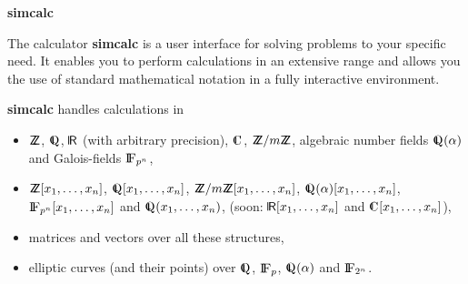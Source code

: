 \newpage
\noindent
\begin{center}
{\Large {\bf simcalc}}
\end{center}

\vspace{0.4cm}

\noindent
The calculator {\bf simcalc} is a user interface for solving problems
to your specific need. It enables you to perform calculations in an
extensive range and allows you the use of standard mathematical
notation in a fully interactive environment. 

\vspace{0.4cm}

\noindent
{\bf simcalc} handles calculations in
\begin{itemize}
\item ${{\sf Z}\hspace{-1.3mm}{\sf Z}}$, $\Q$, $\R$ (with arbitrary precision), $\C$,
${{\sf Z}\hspace{-1.3mm}{\sf Z}}/m{{\sf Z}\hspace{-1.3mm}{\sf Z}}$, algebraic number fields $\Q(\alpha)$ and Galois-fields ${\rm{I\!F}}_{p^n}$,

\item ${{\sf Z}\hspace{-1.3mm}{\sf Z}}[x_1,\ldots ,x_n]$, $\Q[x_1,\ldots ,x_n]$, 
${{\sf Z}\hspace{-1.3mm}{\sf Z}}/m{{\sf Z}\hspace{-1.3mm}{\sf Z}}[x_1,\ldots ,x_n]$, 
$\Q(\alpha)[x_1,\ldots ,x_n]$, ${\rm{I\!F}}_{p^n}[x_1,\ldots ,x_n]$
and $\Q(x_1,\ldots ,x_n)$, (soon: $\R[x_1,\ldots ,x_n]$ and $\C[x_1,
\ldots ,x_n]$),

\item matrices and vectors over all these structures,

\item elliptic curves (and their points) over $\Q$, ${\rm{I\!F}}_p$, $\Q(\alpha)$ and ${\rm{I\!F}}_{2^n}$.

\end{itemize}

\vspace{0.4cm}

